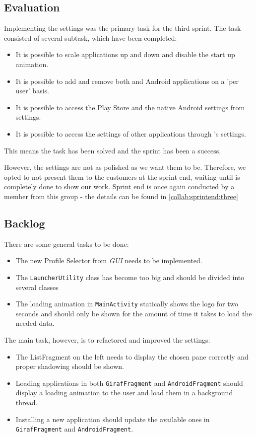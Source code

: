 \subsection{Evaluation}
Implementing the settings was the primary task for the third sprint.
The task consisted of several subtask, which have been completed:

\begin{itemize}
\item It is possible to scale applications up and down and disable the start up animation.
\item It is possible to add and remove both \giraf and Android applications on a 'per user' basis.
\item It is possible to access the Play Store and the native Android settings from settings.
\item It is possible to access the settings of other \giraf applications through \launcher 's settings.
\end{itemize}

This means the task has been solved and the sprint has been a success. 

However, the settings are not as polished as we want them to be.
Therefore, we opted to not present them to the customers at the sprint end, waiting until \launcher is completely done to show our work.
Sprint end is once again conducted by a member from this group - the details can be found in \cref{collab:sprintend:three}

\subsection{Backlog}

There are some general tasks to be done:

\begin{itemize}
\item The new Profile Selector from \textit{GUI} needs to be implemented.
\item The \lstinline!LauncherUtility! class has become too big and should be divided into several classes 
\item The loading animation in \lstinline!MainActivity! statically shows the logo for two seconds and should only be shown for the amount of time it takes to load the needed data.
\end{itemize}

The main task, however, is to refactored and improved the settings:

\begin{itemize}
\item The ListFragment on the left needs to display the chosen pane correctly and proper shadowing should be shown.
\item Loading applications in both \lstinline!GirafFragment! and \lstinline!AndroidFragment! should display a loading animation to the user and load them in a background thread.
\item Installing a new application should update the available ones in \lstinline!GirafFragment! and \lstinline!AndroidFragment!.
\end{itemize}